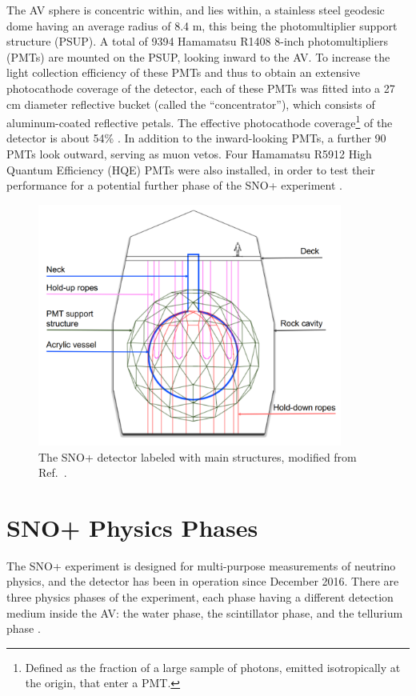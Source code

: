 The AV sphere is concentric within, and lies within, a stainless steel geodesic dome having an average radius of 8.4 m, this being the photomultiplier support structure (PSUP). A total of 9394 Hamamatsu R1408 8-inch photomultipliers (PMTs) are mounted on the PSUP, looking inward to the AV. To increase the light collection efficiency of these PMTs and thus to obtain an extensive photocathode coverage of the detector, each of these PMTs was fitted into a 27 cm diameter reflective bucket (called the ``concentrator''), which consists of aluminum-coated reflective petals. The effective photocathode coverage\footnote{Defined as the fraction of a large sample of photons, emitted isotropically at the origin, that enter a PMT.} of the detector is about 54\% \cite{whitepaper}. In addition to the inward-looking PMTs, a further 90 PMTs look outward, serving as muon vetos. Four Hamamatsu R5912 High Quantum Efficiency (HQE) PMTs were also installed, in order to test their performance for a potential further phase of the SNO+ experiment \cite{stringer2019sensitivity}.

\begin{figure}[htbp]
	\centering
	\includegraphics[width=10cm]{SNOPdetector.png}
	\caption[The SNO+ detector labeled with main structures.]{The SNO+ detector labeled with main structures, modified from Ref.~\cite{jones2011background}.}
	\label{snopdetector}
\end{figure}

\section{SNO+ Physics Phases}\label{sect:physicsPhase}

The SNO+ experiment is designed for multi-purpose measurements of neutrino physics, and the detector has been in operation since December 2016. There are three physics phases of the experiment, each phase having a different detection medium inside the AV: the water phase, the scintillator phase, and the tellurium phase \cite{whitepaper}. 

